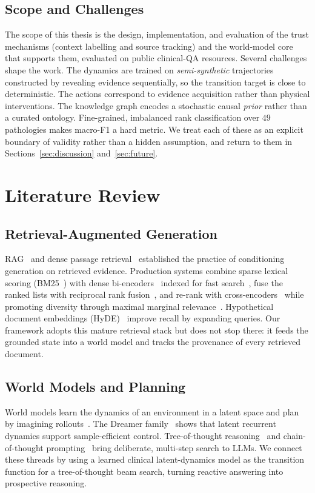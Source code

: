 \documentclass[11pt,a4paper]{report}
\begin{document}
\section{Scope and Challenges}
The scope of this thesis is the design, implementation, and evaluation of the
trust mechanisms (context labelling and source tracking) and the world-model
core that supports them, evaluated on public clinical-QA resources. Several
challenges shape the work. The dynamics are trained on \emph{semi-synthetic}
trajectories constructed by revealing evidence sequentially, so the transition
target is close to deterministic. The actions correspond to evidence
acquisition rather than physical interventions. The knowledge graph encodes a
stochastic causal \emph{prior} rather than a curated ontology. Fine-grained,
imbalanced rank classification over $49$ pathologies makes macro-F1 a hard
metric. We treat each of these as an explicit boundary of validity rather than a
hidden assumption, and return to them in Sections~\ref{sec:discussion}
and~\ref{sec:future}.

\chapter{Literature Review}

\section{Retrieval-Augmented Generation}
RAG~\cite{lewis2020rag} and dense passage retrieval~\cite{karpukhin2020dpr}
established the practice of conditioning generation on retrieved evidence.
Production systems combine sparse lexical scoring
(BM25~\cite{robertson2009bm25}) with dense bi-encoders~\cite{reimers2019sbert}
indexed for fast search~\cite{johnson2019faiss}, fuse the ranked lists with
reciprocal rank fusion~\cite{cormack2009rrf}, and re-rank with
cross-encoders~\cite{nogueira2019passage} while promoting diversity through
maximal marginal relevance~\cite{carbonell1998mmr}. Hypothetical document
embeddings (HyDE)~\cite{gao2023hyde} improve recall by expanding queries. Our
framework adopts this mature retrieval stack but does not stop there: it feeds
the grounded state into a world model and tracks the provenance of every
retrieved document.

\section{World Models and Planning}
World models learn the dynamics of an environment in a latent space and plan by
imagining rollouts~\cite{ha2018worldmodels}. The Dreamer
family~\cite{hafner2020dreamer,hafner2023dreamerv3} shows that latent recurrent
dynamics support sample-efficient control. Tree-of-thought
reasoning~\cite{yao2023tot} and chain-of-thought prompting~\cite{wei2022cot}
bring deliberate, multi-step search to LLMs. We connect these threads by using a
learned clinical latent-dynamics model as the transition function for a
tree-of-thought beam search, turning reactive answering into prospective
reasoning.
\end{document}
